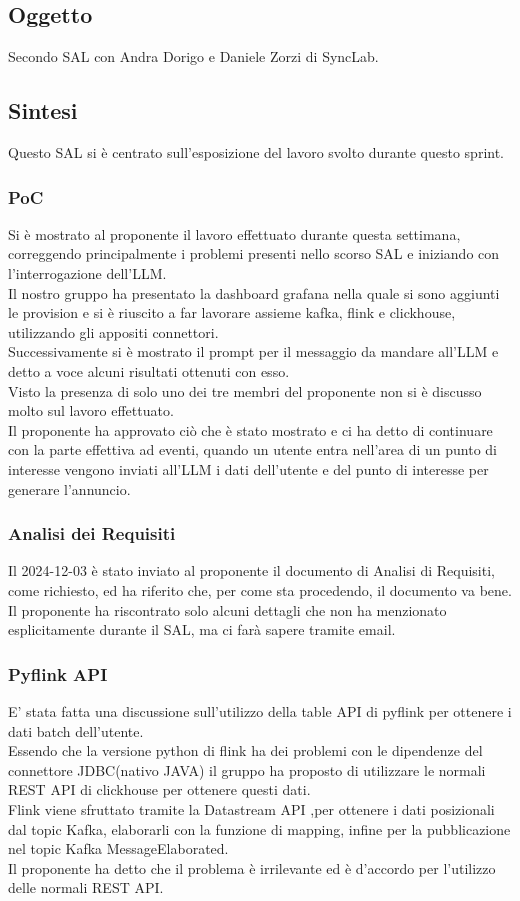 \documentclass[12pt]{article}
\begin{document}
\subsection{Oggetto}
Secondo SAL con Andra Dorigo e Daniele Zorzi di SyncLab.

\subsection{Sintesi}
Questo SAL si è centrato sull'esposizione del lavoro svolto durante questo sprint.
\subsubsection{PoC}
Si è mostrato al proponente il lavoro effettuato durante questa settimana, correggendo principalmente i problemi presenti nello scorso SAL e iniziando con l'interrogazione dell'LLM. \\
Il nostro gruppo ha presentato la dashboard grafana nella quale si sono aggiunti le provision e si è riuscito a far lavorare assieme kafka, flink e clickhouse, utilizzando gli appositi connettori.\\
Successivamente si è mostrato il prompt per il messaggio da mandare all'LLM e detto a voce alcuni risultati ottenuti con esso.\\
Visto la presenza di solo uno dei tre membri del proponente non si è discusso molto sul lavoro effettuato.\\
Il proponente ha approvato ciò che è stato mostrato e ci ha detto di continuare con la parte effettiva ad eventi, quando un utente entra nell'area di un punto di interesse vengono inviati all'LLM i dati dell'utente e del punto di interesse per generare l'annuncio.

\subsubsection{Analisi dei Requisiti}
Il 2024-12-03 è stato inviato al proponente il documento di Analisi di Requisiti, come richiesto, ed ha riferito che, per come sta procedendo, il documento va bene.\\
Il proponente ha riscontrato solo alcuni dettagli che non ha menzionato esplicitamente durante il SAL, ma ci farà sapere tramite email.

\subsubsection{Pyflink API}
E' stata fatta una discussione sull'utilizzo della table API di pyflink per ottenere i dati batch dell'utente.\\
Essendo che la versione python di flink ha dei problemi con le dipendenze del connettore JDBC(nativo JAVA) il gruppo ha proposto di utilizzare le normali REST API di clickhouse per ottenere questi dati.\\
Flink viene sfruttato tramite la Datastream API ,per ottenere i dati posizionali dal topic Kafka, elaborarli con la funzione di mapping, infine per la pubblicazione nel topic Kafka MessageElaborated.\\
Il proponente ha detto che il problema è irrilevante ed è d'accordo per l'utilizzo delle normali REST API.
\end{document}
